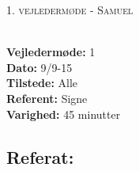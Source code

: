 \documentclass[a4paper,11pt,oneside]{memoir}
\begin{document}

\begin{center} 
\huge{\textsc{1. vejledermøde - Samuel}}
\end{center}

\textbf{ }
\\
\textbf{Vejledermøde:} 1
\\
\textbf{Dato:} 9/9-15
\\
\textbf{Tilstede:} Alle
\\
\textbf{Referent:} Signe
\\
\textbf{Varighed:} 45 minutter
\\

\subsection{Referat:}
\end{document}
